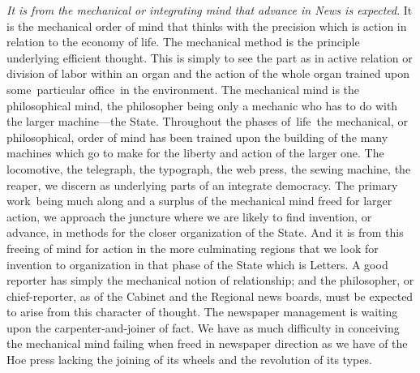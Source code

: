 \documentclass[openany,nobib]{tufte-book}
\begin{document}
\emph{It is from the mechanical or integrating mind that advance in News
is expected}. It is the mechanical order of mind that thinks with the
precision which is action in relation to the economy of life. The
mechanical method is the principle underlying efficient thought. This is
simply to see the part as in active relation or division of labor within
an organ and the action of the whole organ trained upon some~particular
office~in the environment. The mechanical mind is the philosophical
mind, the philosopher being only a mechanic who has to do with the
larger machine---the State. Throughout the phases of~life~the
mechanical, or philosophical, order of mind has been trained upon the
building of the many machines which go to make for the liberty and
action of the larger one. The locomotive, the telegraph, the typograph,
the web press, the sewing machine, the reaper, we discern as underlying
parts of an integrate democracy. The primary work~being much along and a
surplus of the mechanical mind freed for larger action, we approach the
juncture where we are likely to find invention, or advance, in methods
for the closer organization of the State. And it is from this freeing of
mind for action in the more culminating regions that we look for
invention to organization in that phase of the State which is Letters. A
good reporter has simply the mechanical notion of relationship; and the
philosopher, or chief-reporter, as of the Cabinet and the Regional news
boards, must be expected to arise from this character of thought. The
newspaper management is waiting upon the carpenter-and-joiner of fact.
We have as much difficulty in conceiving the mechanical mind failing
when freed in newspaper direction as we have of the Hoe press lacking
the joining of its wheels and the revolution of its types.~

\vspace{0.05in}
\end{document}
